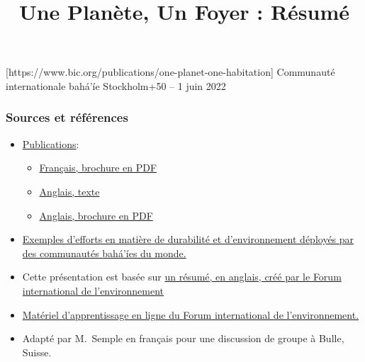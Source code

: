 \documentclass[11pt,xcolor={dvipsnames},hyperref={pdftex,pdfpagemode=UseNone,hidelinks,pdfdisplaydoctitle=true},usepdftitle=false]{beamer}
\begin{document}
\title{Une Planète, Un Foyer : Résumé}
\information%
[https://www.bic.org/publications/one-planet-one-habitation]%
{Communauté internationale bahá’íe}%
{Stockholm+50 -- 1 juin 2022}
\frame{\titlepage}

\begin{frame}
  \frametitle{Sources et références}
  \begin{itemize}
    \item \href{https://www.bic.org/publications/one-planet-one-habitation}%
      {Publications}:
      \begin{itemize}
        \item
          \href{https://www.bic.org/sites/default/files/pdf/opoh_magazine-french-online.pdf}%
          {Français, brochure en PDF}
        \item
          \href{https://www.bic.org/statements/one-planet-one-habitation-bahai-perspective-recasting-humanitys-relationship-natural-world}%
          {Anglais, texte}
        \item
          \href{https://www.bic.org/sites/default/files/pdf/one_planet_one_habitation.pdf}%
          {Anglais, brochure en PDF}
      \end{itemize}
    \item
      \href{https://opoh.bic.org}{Exemples d'efforts en matière de durabilité
      et d'environnement déployés par des communautés bahá'íes du monde.}
    \item Cette présentation est basée sur
      \href{https://iefworld.org/fl/OPOHsummary.pdf}%
      {un résumé, en anglais, créé par le Forum international de l'environnement}
    \item
      \href{https://iefworld.org/elcentre.htm}%
      {Matériel d'apprentissage en ligne du Forum international de l'environnement.}
    \item Adapté par M.\ Semple en français pour une discussion de groupe à
      Bulle, Suisse.
  \end{itemize}
\end{frame}
\end{document}
